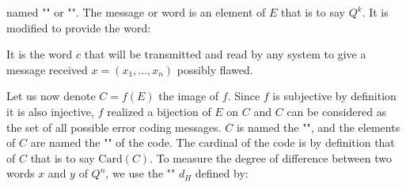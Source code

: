 	named "" or "". The message or word is an element  of $E$ that is to say $Q^k$. It is modified to provide the word: 
	
	It is the word $c$ that will be transmitted and read by any system to give a message received $x=(x_1,...,x_n)$ possibly flawed.
	
	Let us now denote $C=f(E)$ the image of $f$. Since $f$ is subjective by definition it is also injective, $f$ realized a bijection of $E$ on $C$ and $C$ can be considered as the set of all possible error coding messages. $C$ is named the "", and the elements of $C$ are named the "" of the code. The cardinal of the code is by definition that of $C$ that is to say $\text{Card}(C)$. To measure the degree of difference between two words $x$ and $y$ of $Q^n$, we use the "" $d_H$ defined by:
	
